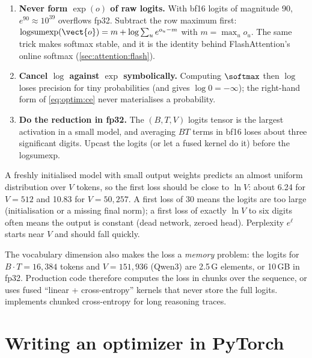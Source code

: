 \begin{enumerate}
  \item \textbf{Never form $\exp(o)$ of raw logits.} With bf16 logits of magnitude 90,
        $e^{90}\approx 10^{39}$ overflows fp32. Subtract the row maximum first:
        $\operatorname{logsumexp}(\vect{o}) = m + \log\sum_u e^{o_u - m}$ with $m=\max_u o_u$.
        The same trick makes softmax stable, and it is the identity behind FlashAttention's
        online softmax (\cref{sec:attention:flash}).
  \item \textbf{Cancel $\log$ against $\exp$ symbolically.} Computing $\softmax$ then $\log$
        loses precision for tiny probabilities (and gives $\log 0=-\infty$); the right-hand form of
        \cref{eq:optim:ce} never materialises a probability.
  \item \textbf{Do the reduction in fp32.} The $(B,T,V)$ logits tensor is the largest activation
        in a small model, and averaging $BT$ terms in bf16 loses about three significant digits.
        Upcast the logits (or let a fused kernel do it) before the logsumexp.
\end{enumerate}

\begin{keyidea}
A freshly initialised model with small output weights predicts an almost uniform distribution
over $V$ tokens, so the first loss should be close to $\ln V$: about 6.24 for $V=512$ and
10.83 for $V=50{,}257$. A first loss of 30 means the logits are too large (initialisation or a
missing final norm); a first loss of exactly $\ln V$ to six digits often means the output is
constant (dead network, zeroed head). Perplexity $e^{\ell}$ starts near $V$ and should fall
quickly.
\end{keyidea}

The vocabulary dimension also makes the loss a \emph{memory} problem: the logits for
$B\cdot T=16{,}384$ tokens and $V=151{,}936$ (Qwen3) are 2.5\,G elements, or 10\,GB in fp32.
Production code therefore computes the loss in chunks over the sequence, or uses fused
``linear + cross-entropy'' kernels that never store the full logits.  implements
chunked cross-entropy for long reasoning traces.

\section{Writing an optimizer in PyTorch}\label{sec:optim:api}

